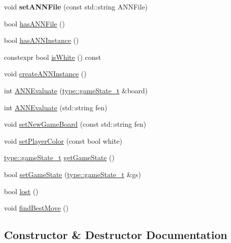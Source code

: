 \begin{DoxyCompactItemize}
\item 
\mbox{\label{classdavid_1_1ChessEngine_a1bdc638fcb3786b930b676e9f0c5848f}} 
void {\bfseries set\+A\+N\+N\+File} (const std\+::string A\+N\+N\+File)
\item 
bool \hyperlink{classdavid_1_1ChessEngine_a311f1a02d29e394759d20ca656c79ad2}{has\+A\+N\+N\+File} ()
\item 
bool \hyperlink{classdavid_1_1ChessEngine_a613d9156ef352542a940f544779036ad}{has\+A\+N\+N\+Instance} ()
\item 
constexpr bool \hyperlink{classdavid_1_1ChessEngine_aad68f52fc4118e10b932b35117062ad2}{is\+White} () const
\item 
void \hyperlink{classdavid_1_1ChessEngine_a0f3c9b1664dc4e8eb84bde2da018500d}{create\+A\+N\+N\+Instance} ()
\item 
int \hyperlink{classdavid_1_1ChessEngine_a3779b125c09306c2518b0a752a1e06c4}{A\+N\+N\+Evaluate} (\hyperlink{structdavid_1_1bitboard_1_1gameState}{type\+::game\+State\+\_\+t} \&board)
\item 
int \hyperlink{classdavid_1_1ChessEngine_a86fd8cfd367471192bc0061ae19b16af}{A\+N\+N\+Evaluate} (std\+::string fen)
\item 
void \hyperlink{classdavid_1_1ChessEngine_a503d008299e7b29f93426938eac42d9a}{set\+New\+Game\+Board} (const std\+::string fen)
\item 
void \hyperlink{classdavid_1_1ChessEngine_aafa56ec5ce01a62e385e660b73cdfbd2}{set\+Player\+Color} (const bool white)
\item 
\hyperlink{structdavid_1_1bitboard_1_1gameState}{type\+::game\+State\+\_\+t} \hyperlink{classdavid_1_1ChessEngine_aad2aa712b003d233c682463de9930fd2}{get\+Game\+State} ()
\item 
bool \hyperlink{classdavid_1_1ChessEngine_a9ae5dd5a237f7ed341a320944285d1f7}{set\+Game\+State} (\hyperlink{structdavid_1_1bitboard_1_1gameState}{type\+::game\+State\+\_\+t} \&gs)
\item 
bool \hyperlink{classdavid_1_1ChessEngine_a498710f8adfacee9b066d69e5c9399c5}{lost} ()
\item 
void \hyperlink{classdavid_1_1ChessEngine_a8a7024be604538049a4606be80ee054f}{find\+Best\+Move} ()
\end{DoxyCompactItemize}


\subsection{Constructor \& Destructor Documentation}
\mbox{\label{classdavid_1_1ChessEngine_a8207c17987e0e3fca64a71288a3fabfc}} 
